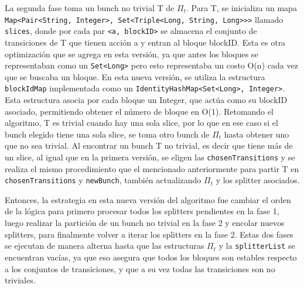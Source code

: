La segunda fase toma un bunch no trivial T de $\Pi_t$. Para T, se inicializa un mapa \texttt{Map\textless Pair\textless String, Integer\textgreater, Set\textless Triple\textless Long, String, Long\textgreater\textgreater\textgreater} llamado \texttt{slices}, donde por cada par \texttt{\textless a, blockID\textgreater} se almacena el conjunto de transiciones de T que tienen acción a y entran al bloque blockID. Esta es otra optimización que se agrega en esta versión, ya que antes los bloques se representaban como un \texttt{Set\textless Long\textgreater} pero esto representaba un costo O(n) cada vez que se buscaba un bloque. En esta nueva versión, se utiliza la estructura \texttt{blockIdMap} implementada como un \texttt{IdentityHashMap\textless Set\textless Long\textgreater, Integer\textgreater}. Esta estructura asocia por cada bloque un Integer, que actúa como su blockID asociado, permitiendo obtener el número de bloque en O(1). Retomando el algoritmo, T es trivial cuando hay una sola slice, por lo que en ese caso si el bunch elegido tiene una sola slice, se toma otro bunch de $\Pi_t$ hasta obtener uno que no sea trivial. Al encontrar un bunch T no trivial, es decir que tiene más de un slice, al igual que en la primera versión, se eligen las \texttt{chosenTransitions} y se realiza el mismo procedimiento que el mencionado anteriormente para partir T en \texttt{chosenTransitions} y \texttt{newBunch}, también actualizando $\Pi_t$ y los splitter asociados.

Entonces, la estrategia en esta nueva versión del algoritmo fue cambiar el orden de la lógica para primero procesar todos los splitters pendientes en la fase 1, luego realizar la partición de un bunch no trivial en la fase 2 y encolar nuevos splitters, para finalmente volver a iterar los splitters en la fase 2. Estas dos fases se ejecutan de manera alterna hasta que las estructuras $\Pi_t$ y la \texttt{splitterList} se encuentran vacías, ya que eso asegura que todos los bloques son estables respecto a los conjuntos de transiciones, y que a su vez todas las transiciones son no triviales. 

